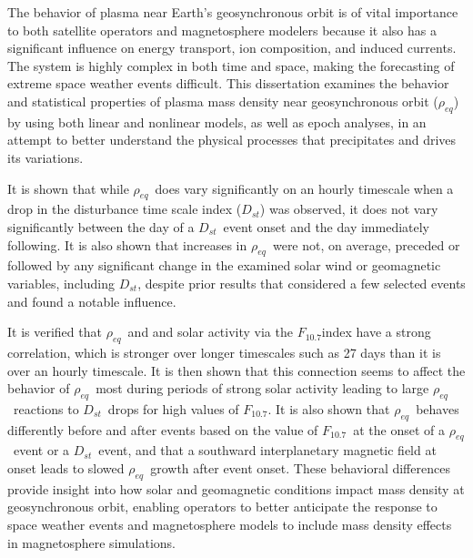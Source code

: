 \documentclass[11 pt]{GMUDissertation}
\newcommand{\req}{\ensuremath{\rho_{eq}}} %
\newcommand{\dst}{\ensuremath{D_{st}}} %
\newcommand{\f}{\ensuremath{F_{10.7}}} %
\begin{document}

\tableofcontents

\listoftables

\listoffigures







\abstractpage


The behavior of plasma near Earth's geosynchronous orbit is of vital importance to both satellite operators and magnetosphere modelers because it also has a significant influence on energy transport, ion composition, and induced currents. The system is highly complex in both time and space, making the forecasting of extreme space weather events difficult. This dissertation examines the behavior and statistical properties of plasma mass density near geosynchronous orbit (\req) by using both linear and nonlinear models, as well as epoch analyses, in an attempt to better understand the physical processes that precipitates and drives its variations. 

It is shown that while \req\ does vary significantly on an hourly timescale when a drop in the disturbance time scale index (\dst) was observed, it does not vary significantly between the day of a \dst\ event onset and the day immediately following. It is also shown that increases in \req\ were not, on average, preceded or followed by any significant change in the examined solar wind or geomagnetic variables, including \dst, despite prior results that considered a few selected events and found a notable influence. 

%

\abstractmultiplepage


It is verified that \req\ and and solar activity via the \f index have a strong correlation, which is stronger over longer timescales such as 27 days than it is over an hourly timescale. It is then shown that this connection seems to affect the behavior of \req\ most during periods of strong solar activity leading to large \req\ reactions to \dst\ drops for high values of \f.  It is also shown that \req\ behaves differently before and after events based on the value of \f\ at the onset of a \req\ event or a \dst\ event, and that a southward interplanetary magnetic field at onset leads to slowed \req\ growth after event onset. These behavioral differences provide insight into how solar and geomagnetic conditions impact mass density at geosynchronous orbit, enabling operators to better anticipate the response to space weather events and magnetosphere models to include mass density effects in magnetosphere simulations.
\end{document}
